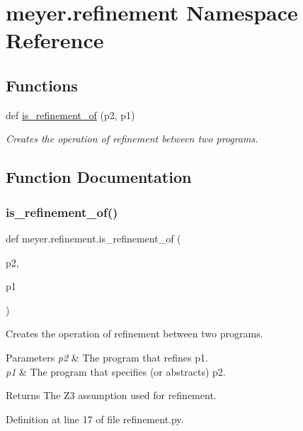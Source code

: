 \hypertarget{namespacemeyer_1_1refinement}{}\section{meyer.\+refinement Namespace Reference}
\label{namespacemeyer_1_1refinement}
\subsection*{Functions}
\begin{DoxyCompactItemize}
\item 
def \hyperlink{namespacemeyer_1_1refinement_ab726de4daa9a4f5fa8b13fc4a2d63337}{is\+\_\+refinement\+\_\+of} (p2, p1)
\begin{DoxyCompactList}\small\item\em Creates the operation of refinement between two programs. \end{DoxyCompactList}\end{DoxyCompactItemize}


\subsection{Function Documentation}
\mbox{\label{namespacemeyer_1_1refinement_ab726de4daa9a4f5fa8b13fc4a2d63337}} 
\subsubsection{\texorpdfstring{is\+\_\+refinement\+\_\+of()}{is\_refinement\_of()}}
{\footnotesize\ttfamily def meyer.\+refinement.\+is\+\_\+refinement\+\_\+of (\begin{DoxyParamCaption}\item[{}]{p2,  }\item[{}]{p1 }\end{DoxyParamCaption})}



Creates the operation of refinement between two programs. 


\begin{DoxyParams}{Parameters}
{\em p2} & The program that refines p1. \\
\hline
{\em p1} & The program that specifies (or abstracts) p2. \\
\hline
\end{DoxyParams}
\begin{DoxyReturn}{Returns}
The Z3 assumption used for refinement. 
\end{DoxyReturn}


Definition at line 17 of file refinement.\+py.

